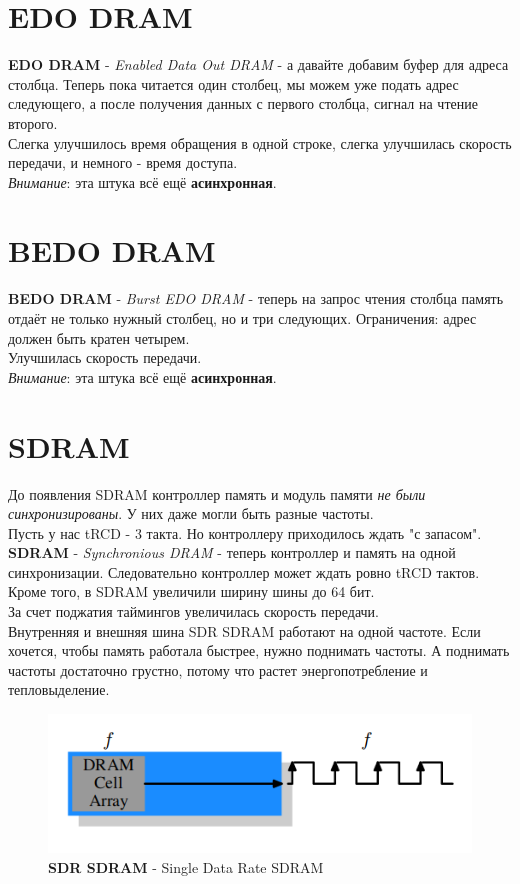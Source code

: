 \documentclass[12pt, a4paper]{article}
\begin{document}
\section{EDO DRAM}
\textbf{EDO DRAM} - \textit{Enabled Data Out DRAM} - а давайте добавим буфер для адреса столбца. Теперь пока читается один столбец, мы можем уже подать адрес следующего, а после получения данных с первого столбца, сигнал на чтение второго.\\
Слегка улучшилось время обращения в одной строке, слегка улучшилась скорость передачи, и немного - время доступа.\\
\textit{Внимание}: эта штука всё ещё \textbf{асинхронная}.
\section{BEDO DRAM}
\textbf{BEDO DRAM} - \textit{Burst EDO DRAM} - теперь на запрос чтения столбца память отдаёт не только нужный столбец, но и три следующих. Ограничения: адрес должен быть кратен четырем.\\
Улучшилась скорость передачи.\\
\textit{Внимание}: эта штука всё ещё \textbf{асинхронная}.
\section{SDRAM}
До появления SDRAM контроллер память и модуль памяти \textit{не были синхронизированы}. У них даже могли быть разные частоты.\\
Пусть у нас tRCD - 3 такта. Но контроллеру приходилось ждать "с запасом".\\
\textbf{SDRAM} - \textit{Synchronious DRAM} - теперь контроллер и память на одной синхронизации. Следовательно контроллер может ждать ровно tRCD тактов.\\
Кроме того, в SDRAM увеличили ширину шины до 64 бит.\\
За счет поджатия таймингов увеличилась скорость передачи.\\
Внутренняя и внешняя шина SDR SDRAM работают на одной частоте. Если хочется, чтобы память работала быстрее, нужно поднимать частоты. А поднимать частоты достаточно грустно, потому что растет энергопотребление и тепловыделение.
\begin{figure}[h]
    \centering
    \includegraphics[scale=0.6]{./images/SDR_SDRAM.png}
    \caption{\textbf{SDR SDRAM} - Single Data Rate SDRAM}
    \label{fig:SDR_SDRAM}
\end{figure}
\end{document}
